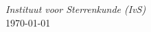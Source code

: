 \documentclass[12pt]{article}
\begin{document}
\begin{titlepage}
\large \textit{Instituut voor Sterrenkunde (IvS)}\\[0.3cm]



{\large \today}\\[2cm] %


\vfill %

\end{titlepage}
\setlength{\parindent}{0pt}
\tableofcontents
\newpage
\end{document}

